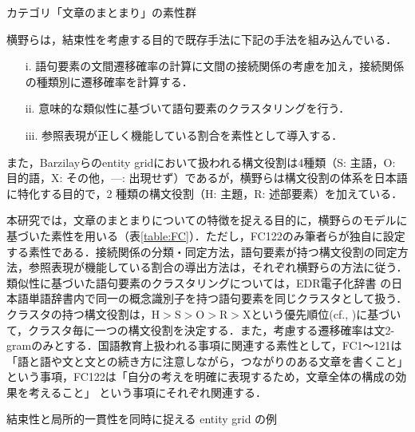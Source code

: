 \documentclass[japanese]{jnlp_1.5}
\let\underline
\newenvironment{indent1zw}{}{}
\begin{document}
\begin{table}[b]
\caption{カテゴリ「文章のまとまり」の素性群}
\label{table:FC}

\end{table}

横野らは，結束性を考慮する目的で既存手法に下記の手法を組み込んでいる．

\begin{enumerate}
\item[i.] 語句要素の文間遷移確率の計算に文間の接続関係の考慮を加え，接続関係の種類別に遷移確率を計算する．
\item[ii.] 意味的な類似性に基づいて語句要素のクラスタリングを行う．
\item[iii.] 参照表現が正しく機能している割合を素性として導入する．
\end{enumerate}

また，Barzilayらのentity gridにおいて扱われる構文役割は4種類（S: 主語，O: 目的語，X: その他，---: 出現せず）であるが，横野らは構文役割の体系を日本語に特化する目的で，2 種類の構文役割（H: 主題，R: 述部要素）を加えている．

本研究では，文章のまとまりについての特徴を捉える目的に，横野らのモデルに基づいた素性を用いる（表\ref{table:FC}）．ただし，FC122のみ筆者らが独自に設定する素性である．接続関係の分類・同定方法，語句要素が持つ構文役割の同定方法，参照表現が機能している割合の導出方法は，それぞれ横野らの方法に従う．類似性に基づいた語句要素のクラスタリングについては，EDR電子化辞書\cite{NihonDenshikaJishoKenkyujo2010}
の日本語単語辞書内で同一の概念識別子を持つ語句要素を同じクラスタとして扱う．クラスタの持つ構文役割は，$\text{H}>\text{S}>\text{O}>\text{R}>\text{X}$という優先順位(cf., \cite{WalkerIidaCote1994})に基づいて，クラスタ毎に一つの構文役割を決定する．また，考慮する遷移確率は文2-gramのみとする．国語教育上扱われる事項に関連する素性として，FC1〜121は「語と語や文と文との続き方に注意しながら，つながりのある文章を書くこと」\cite{MonbuKagakuSho2008}
という事項，FC122は「自分の考えを明確に表現するため，文章全体の構成の効果を考えること」
\cite{MonbuKagakuSho2008}
という事項にそれぞれ関連する．


\begin{table}[b]
\caption{結束性と局所的一貫性を同時に捉える entity grid の例}
\label{table:EntityGrid}

\end{table}
\end{document}
